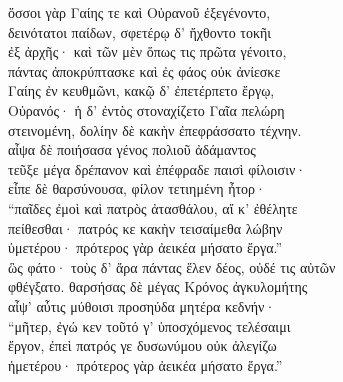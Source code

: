 \begin{pages}
\begin{Leftside}
\quad{}ὅσσοι γὰρ Γαίης τε καὶ Οὐρανοῦ ἐξεγένοντο,\\
δεινότατοι παίδων, σφετέρῳ δ' ἤχθοντο τοκῆι \\
ἐξ ἀρχῆς· καὶ τῶν μὲν ὅπως τις πρῶτα γένοιτο, \\
πάντας ἀποκρύπτασκε καὶ ἐς φάος οὐκ ἀνίεσκε\\
Γαίης ἐν κευθμῶνι, κακῷ δ' ἐπετέρπετο ἔργῳ, \\
Οὐρανός· ἡ δ' ἐντὸς στοναχίζετο Γαῖα πελώρη\\
στεινομένη, δολίην δὲ κακὴν ἐπεφράσσατο τέχνην. \\
αἶψα δὲ ποιήσασα γένος πολιοῦ ἀδάμαντος\\
τεῦξε μέγα δρέπανον καὶ ἐπέφραδε παισὶ φίλοισιν· \\

\quad{}εἶπε δὲ θαρσύνουσα, φίλον τετιημένη ἦτορ·\\
``παῖδες ἐμοὶ καὶ πατρὸς ἀτασθάλου, αἴ κ' ἐθέλητε\\
πείθεσθαι· πατρός κε κακὴν τεισαίμεθα λώβην \\
ὑμετέρου· πρότερος γὰρ ἀεικέα μήσατο ἔργα.'' \\
ὣς φάτο· τοὺς δ' ἄρα πάντας ἕλεν δέος, οὐδέ τις αὐτῶν\\

\quad{}φθέγξατο. θαρσήσας δὲ μέγας Κρόνος ἀγκυλομήτης\\
αἶψ' αὖτις μύθοισι προσηύδα μητέρα κεδνήν·\\
``μῆτερ, ἐγώ κεν τοῦτό γ' ὑποσχόμενος τελέσαιμι  \\
ἔργον, ἐπεὶ πατρός γε δυσωνύμου οὐκ ἀλεγίζω\\
ἡμετέρου· πρότερος γὰρ ἀεικέα μήσατο ἔργα.''\\


\end{Leftside}
\end{pages}
